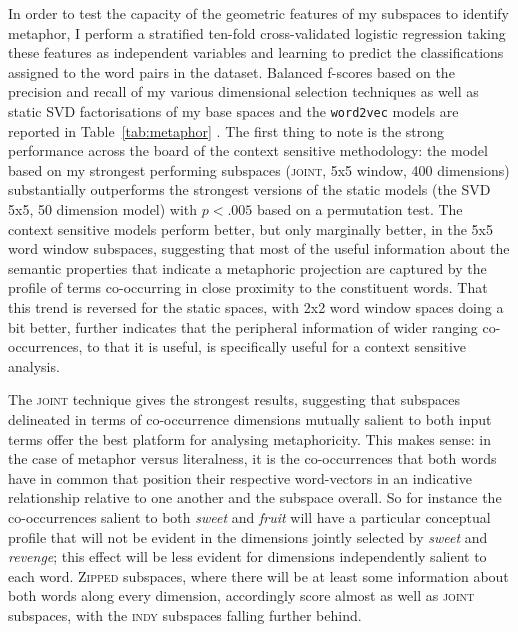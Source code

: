 In order to test the capacity of the geometric features of my subspaces to identify metaphor, I perform a stratified ten-fold cross-validated logistic regression taking these features as independent variables and learning to predict the classifications assigned to the word pairs in the dataset.  Balanced f-scores based on the precision and recall of my various dimensional selection techniques as well as static SVD factorisations of my base spaces and the \texttt{word2vec} models are reported in Table~\ref{tab:metaphor} .  The first thing to note is the strong performance across the board of the context sensitive methodology: the model based on my strongest performing subspaces (\textsc{joint}, 5x5 window, 400 dimensions) substantially outperforms the strongest versions of the static models (the SVD 5x5, 50 dimension model) with $p < .005$ based on a permutation test.  The context sensitive models perform better, but only marginally better, in the 5x5 word window subspaces, suggesting that most of the useful information about the semantic properties that indicate a metaphoric projection are captured by the profile of terms co-occurring in close proximity to the constituent words.  That this trend is reversed for the static spaces, with 2x2 word window spaces doing a bit better, further indicates that the peripheral information of wider ranging co-occurrences, to that it is useful, is specifically useful for a context sensitive analysis.

The \textsc{joint} technique gives the strongest results, suggesting that subspaces delineated in terms of co-occurrence dimensions mutually salient to both input terms offer the best platform for analysing metaphoricity.  This makes sense: in the case of metaphor versus literalness, it is the co-occurrences that both words have in common that position their respective word-vectors in an indicative relationship relative to one another and the subspace overall.  So for instance the co-occurrences salient to both \emph{sweet} and \emph{fruit} will have a particular conceptual profile that will not be evident in the dimensions jointly selected by \emph{sweet} and \emph{revenge}; this effect will be less evident for dimensions independently salient to each word.  \textsc{Zipped} subspaces, where there will be at least some information about both words along every dimension, accordingly score almost as well as \textsc{joint} subspaces, with the \textsc{indy} subspaces falling further behind.

